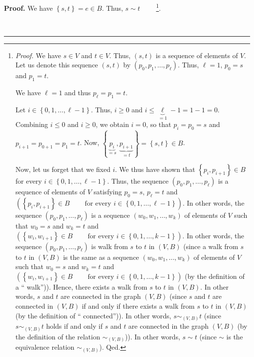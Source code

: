 \documentclass[numbers=enddot,12pt,final,onecolumn,notitlepage]{scrartcl}%
\theoremstyle{definition}
\newenvironment{proof}[1][Proof]{\noindent\textbf{#1.} }{\ \rule{0.5em}{0.5em}}
\newenvironment{verlong}{}{}
\begin{document}
\begin{verlong}
\begin{proof}
We have $\left\{  s,t\right\}  =e\in B$. Thus, $s\sim t$%
\ \ \ \ \footnote{\textit{Proof.} We have $s\in V$ and $t\in V$. Thus,
$\left(  s,t\right)  $ is a sequence of elements of $V$. Let us denote this
sequence $\left(  s,t\right)  $ by $\left(  p_{0},p_{1},\ldots,p_{\ell
}\right)  $. Thus, $\ell=1$, $p_{0}=s$ and $p_{1}=t$.
\par
We have $\ell=1$ and thus $p_{\ell}=p_{1}=t$.
\par
Let $i\in\left\{  0,1,\ldots,\ell-1\right\}  $. Thus, $i\geq0$ and
$i\leq\underbrace{\ell}_{=1}-1=1-1=0$. Combining $i\leq0$ and $i\geq0$, we
obtain $i=0$, so that $p_{i}=p_{0}=s$ and $p_{i+1}=p_{0+1}=p_{1}=t$. Now,
$\left\{  \underbrace{p_{i}}_{=s},\underbrace{p_{i+1}}_{=t}\right\}  =\left\{
s,t\right\}  \in B$.
\par
Now, let us forget that we fixed $i$. We thus have shown that $\left\{
p_{i},p_{i+1}\right\}  \in B$ for every $i\in\left\{  0,1,\ldots
,\ell-1\right\}  $. Thus, the sequence $\left(  p_{0},p_{1},\ldots,p_{\ell
}\right)  $ is a sequence of elements of $V$ satisfying $p_{0}=s$, $p_{\ell
}=t$ and $\left(  \left\{  p_{i},p_{i+1}\right\}  \in
B\ \ \ \ \ \ \ \ \ \ \text{for every }i\in\left\{  0,1,\ldots,\ell-1\right\}
\right)  $. In other words, the sequence $\left(  p_{0},p_{1},\ldots,p_{\ell
}\right)  $ is a sequence $\left(  w_{0},w_{1},\ldots,w_{k}\right)  $ of
elements of $V$ such that $w_{0}=s$ and $w_{k}=t$ and $\left(  \left\{
w_{i},w_{i+1}\right\}  \in B\ \ \ \ \ \ \ \ \ \ \text{for every }i\in\left\{
0,1,\ldots,k-1\right\}  \right)  $. In other words, the sequence $\left(
p_{0},p_{1},\ldots,p_{\ell}\right)  $ is walk from $s$ to $t$ in $\left(
V,B\right)  $ (since a walk from $s$ to $t$ in $\left(  V,B\right)  $ is the
same as a sequence $\left(  w_{0},w_{1},\ldots,w_{k}\right)  $ of elements of
$V$ such that $w_{0}=s$ and $w_{k}=t$ and $\left(  \left\{  w_{i}%
,w_{i+1}\right\}  \in B\ \ \ \ \ \ \ \ \ \ \text{for every }i\in\left\{
0,1,\ldots,k-1\right\}  \right)  $ (by the definition of a \textquotedblleft
walk\textquotedblright)). Hence, there exists a walk from $s$ to $t$ in
$\left(  V,B\right)  $. In other words, $s$ and $t$ are connected in the graph
$\left(  V,B\right)  $ (since $s$ and $t$ are connected in $\left(
V,B\right)  $ if and only if there exists a walk from $s$ to $t$ in $\left(
V,B\right)  $ (by the definition of \textquotedblleft
connected\textquotedblright)). In other words, $s\sim_{\left(  V,B\right)  }t$
(since $s\sim_{\left(  V,B\right)  }t$ holds if and only if $s$ and $t$ are
connected in the graph $\left(  V,B\right)  $ (by the definition of the
relation $\sim_{\left(  V,B\right)  }$)). In other words, $s\sim t$ (since
$\sim$ is the equivalence relation $\sim_{\left(  V,B\right)  }$). Qed.}.


\end{proof}
\end{verlong}
\end{document}
